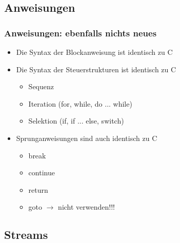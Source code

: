 \subsection{Anweisungen\hfill}
\label{sec:unterabschnitt}

\subsubsection{Anweisungen: ebenfalls nichts neues\hfill}
\label{sec:unterunterabschnitt}
\begin{itemize}
	\item Die Syntax der Blockanweisung ist identisch zu C
	\item Die Syntax der Steuerstrukturen ist identisch zu C
	\begin{itemize}
		\item Sequenz
		\item Iteration (for, while, do ... while)
		\item Selektion (if, if ... else, switch)
	\end{itemize}
	\item Sprunganweisungen sind auch identisch zu C
	\begin{itemize}
		\item break
		\item continue
		\item return
		\item goto $\rightarrow$ nicht verwenden!!!
	\end{itemize}
\end{itemize}

\subsection{Streams\hfill}
\label{sec:unterabschnitt}

